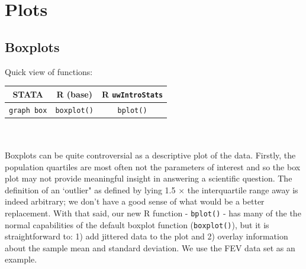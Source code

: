 \documentclass[11pt,letterpaper,fleqn]{report}
\begin{document}
\chapter{Plots}

\section{Boxplots}
Quick view of functions:\\
\begin{tabular}{ccc}
STATA & R (base) & R \texttt{uwIntroStats}\\
\hline
\texttt{graph box} & \texttt{boxplot()} & \texttt{bplot()}
\end{tabular}\\
\\
Boxplots can be quite controversial as a descriptive plot of the data. Firstly, the population quartiles are most often not the parameters of interest and so the box plot may not provide meaningful insight in answering a scientific question. The definition of an `outlier" as defined by lying 1.5 $\times$ the interquartile range away is indeed arbitrary; we don't have a good sense of what would be a better replacement. With that said, our new R function - \texttt{bplot()} - has many of the the normal capabilities of the default boxplot function (\texttt{boxplot()}), but it is straightforward to: 1) add jittered data to the plot and 2) overlay information about the sample mean and standard deviation. We use the FEV data set as an example.
\end{document}
